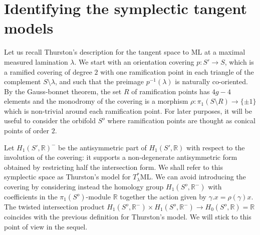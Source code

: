 \documentclass{amsart}
\newcommand{\R}{\mathbb{R}}
\newcommand{\ML}{\mathrm{ML}}
\begin{document}

\section{Identifying the symplectic tangent models}\label{sectionthurston}

Let us recall Thurston's description for the tangent space to $\ML$ at a maximal measured lamination $\lambda$. We start with an orientation covering $p\colon S'\to S$, which is a ramified covering of degree $2$ with one ramification point in each triangle of the complement $S\setminus \lambda$, and such that the preimage $p^{-1}(\lambda)$ is naturally co-oriented. By the Gauss-bonnet theorem, the set $R$ of ramification points has $4g-4$ elements and the monodromy of the covering is a morphism $\rho\colon \pi_1(S\setminus R)\to\{\pm 1\}$ which is non-trivial around each ramification point. For later purposes, it will be useful to consider the orbifold $S^o$ where ramification points are thought as conical points of order $2$.

Let $H_1(S',\R)^-$ be the antisymmetric part of $H_1(S',\R)$ with respect to the involution of the covering: it supports a non-degenerate antisymmetric form obtained by restricting half the intersection form.
%
We shall refer to this symplectic space as Thurston's model for $T^*_\lambda\ML$.
%
We can avoid introducing the covering by considering instead the homology group $H_1(S^o,\R^-)$ with coefficients in the $\pi_1(S^o)$-module $\R$ together the action given by $\gamma.x=\rho(\gamma)x$. The twisted intersection product $H_1(S^o,\R^-)\times H_1(S^o,\R^-)\to H_0(S^o,\R)=\R$ coincides with the previous definition for Thurston's model. We will stick to this point of view in the sequel.
\end{document}
